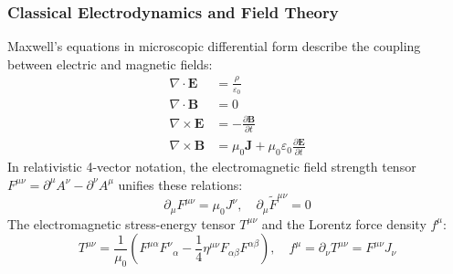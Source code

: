 \documentclass[11pt, a4paper]{article}
\begin{document}
\subsubsection{Classical Electrodynamics and Field Theory}
Maxwell's equations in microscopic differential form describe the coupling between electric and magnetic fields:
\begin{align}
\nabla \cdot \mathbf{E} &= \frac{\rho}{\varepsilon_0} \\
\nabla \cdot \mathbf{B} &= 0 \\
\nabla \times \mathbf{E} &= -\frac{\partial \mathbf{B}}{\partial t} \\
\nabla \times \mathbf{B} &= \mu_0 \mathbf{J} + \mu_0 \varepsilon_0 \frac{\partial \mathbf{E}}{\partial t}
\end{align}
In relativistic 4-vector notation, the electromagnetic field strength tensor $F^{\mu\nu} = \partial^\mu A^\nu - \partial^\nu A^\mu$ unifies these relations:
\begin{equation}
\partial_\mu F^{\mu\nu} = \mu_0 J^\nu, \quad \partial_\mu \tilde{F}^{\mu\nu} = 0
\end{equation}
The electromagnetic stress-energy tensor $T^{\mu\nu}$ and the Lorentz force density $f^\mu$:
\begin{equation}
T^{\mu\nu} = \frac{1}{\mu_0} \left( F^{\mu\alpha} F^\nu{}_\alpha - \frac{1}{4} \eta^{\mu\nu} F_{\alpha\beta} F^{\alpha\beta} \right), \quad f^\mu = \partial_\nu T^{\mu\nu} = F^{\mu\nu} J_\nu
\end{equation}
\end{document}

